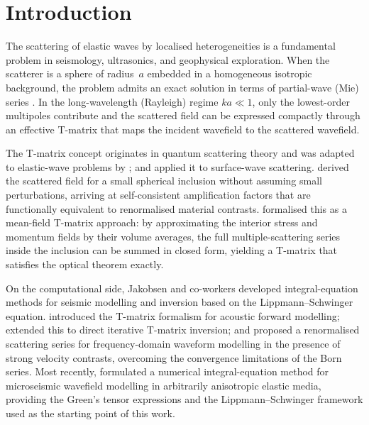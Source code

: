 
\section{Introduction}

The scattering of elastic waves by localised heterogeneities is a fundamental
problem in seismology, ultrasonics, and geophysical exploration.  When the
scatterer is a sphere of radius~$a$ embedded in a homogeneous isotropic
background, the problem admits an exact solution in terms of partial-wave (Mie)
series \citep{Korneev1993,Gritto1995}.  In the long-wavelength (Rayleigh) regime
$ka\ll 1$, only the lowest-order multipoles contribute and the scattered field
can be expressed compactly through an effective T-matrix that maps the incident
wavefield to the scattered wavefield.

The T-matrix concept originates in quantum scattering theory and was adapted to
elastic-wave problems by \citet{Waterman1976}; \citet{Bostock1991}
and \citet{BostockKennett1992} applied it to surface-wave
scattering.  \citet{Pollitz1998} derived the scattered field for a small
spherical inclusion without assuming small perturbations, arriving at
self-consistent amplification factors that are functionally equivalent to
renormalised material contrasts.  \citet{Pellegrini2011}
formalised this as a mean-field T-matrix approach: by approximating the interior
stress and momentum fields by their volume averages, the full
multiple-scattering series inside the inclusion can be summed in closed form,
yielding a T-matrix that satisfies the optical theorem exactly.

On the computational side, Jakobsen and co-workers developed integral-equation
methods for seismic modelling and inversion based on the Lippmann--Schwinger
equation.  \citet{Jakobsen2012} introduced the T-matrix formalism for
acoustic forward modelling; \citet{JakobsenUrsin2015} extended
this to direct iterative T-matrix inversion; and \citet{JakobsenWu2016}
proposed a renormalised scattering series for frequency-domain waveform modelling
in the presence of strong velocity contrasts, overcoming the convergence
limitations of the Born series.  Most recently, \citet{Shekhar2024} formulated a numerical integral-equation method for
microseismic wavefield modelling in arbitrarily anisotropic elastic media,
providing the Green's tensor expressions and the Lippmann--Schwinger framework
used as the starting point of this work.

